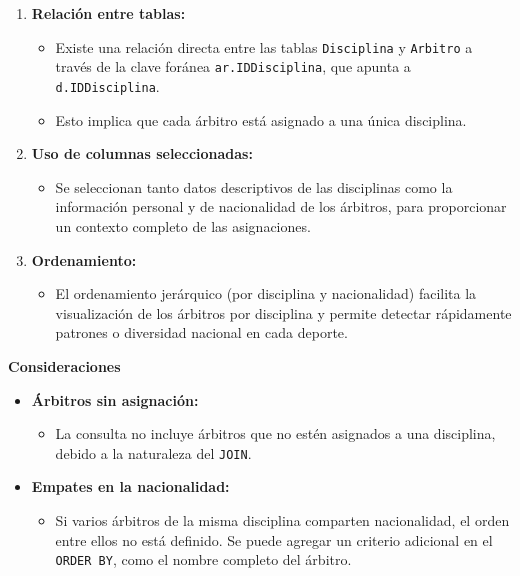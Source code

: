 \begin{enumerate}
   \item \textbf{Relación entre tablas:}
   \begin{itemize}
       \item Existe una relación directa entre las tablas \texttt{Disciplina} y \texttt{Arbitro} a través de la clave foránea \texttt{ar.IDDisciplina}, que apunta a \texttt{d.IDDisciplina}.
       \item Esto implica que cada árbitro está asignado a una única disciplina.
   \end{itemize}
   
   \item \textbf{Uso de columnas seleccionadas:}
   \begin{itemize}
       \item Se seleccionan tanto datos descriptivos de las disciplinas como la información personal y de nacionalidad de los árbitros, para proporcionar un contexto completo de las asignaciones.
   \end{itemize}
   
   \item \textbf{Ordenamiento:}
   \begin{itemize}
       \item El ordenamiento jerárquico (por disciplina y nacionalidad) facilita la visualización de los árbitros por disciplina y permite detectar rápidamente patrones o diversidad nacional en cada deporte.
   \end{itemize}
\end{enumerate}

\textbf{Consideraciones}

\begin{itemize}
   \item \textbf{Árbitros sin asignación:}
   \begin{itemize}
       \item La consulta no incluye árbitros que no estén asignados a una disciplina, debido a la naturaleza del \texttt{JOIN}.
   \end{itemize}
   \item \textbf{Empates en la nacionalidad:}
   \begin{itemize}
       \item Si varios árbitros de la misma disciplina comparten nacionalidad, el orden entre ellos no está definido. Se puede agregar un criterio adicional en el \texttt{ORDER BY}, como el nombre completo del árbitro.
   \end{itemize}
\end{itemize}

